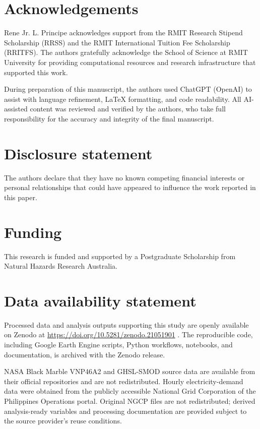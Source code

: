 \documentclass[]{interact}
\theoremstyle{plain}%
\theoremstyle{definition}
\theoremstyle{remark}
\begin{document}
    \section*{Acknowledgements}
    
    Rene Jr. L. Principe acknowledges support from the RMIT Research Stipend Scholarship (RRSS) and the RMIT International Tuition Fee Scholarship (RRITFS). The authors gratefully acknowledge the School of Science at RMIT University for providing computational resources and research infrastructure that supported this work.

    During preparation of this manuscript, the authors used ChatGPT (OpenAI) to assist with language refinement, LaTeX formatting, and code readability. All AI-assisted content was reviewed and verified by the authors, who take full responsibility for the accuracy and integrity of the final manuscript.
    
    \section*{Disclosure statement}
    
    The authors declare that they have no known competing financial interests or personal relationships that could have appeared to influence the work reported in this paper.
    
    \section*{Funding}
    
    This research is funded and supported by a Postgraduate Scholarship from Natural Hazards Research Australia.
    
    \section*{Data availability statement}
    
    Processed data and analysis outputs supporting this study are openly available on Zenodo at
    \url{https://doi.org/10.5281/zenodo.21051901} \citep{Principe2026_Data}.
    The reproducible code, including Google Earth Engine scripts, Python workflows, notebooks, and documentation, is archived with the Zenodo release.
    
    NASA Black Marble VNP46A2 and GHSL-SMOD source data are available from their official repositories and are not redistributed. Hourly electricity-demand data were obtained from the publicly accessible National Grid Corporation of the Philippines
    Operations portal. Original NGCP files are not redistributed; derived analysis-ready variables and processing documentation are provided subject to the source provider's reuse conditions.
    
\end{document}
